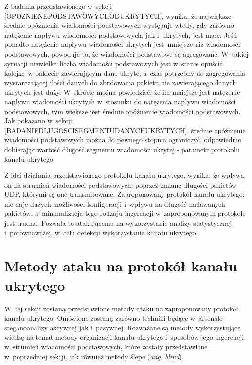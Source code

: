 \documentclass[a4paper, twoside, openright, 12pt]{report}
\begin{document}
        Z badania przedstawionego w~sekcji \ref{OPOZNIENEPODSTAWOWYCHODUKRYTYCH},
        wynika, że największe średnie opóźnienia wiadomości podstawowych
        występuje wtedy, gdy zarówno natężenie napływu wiadomości podstawowych, jak i~ukrytych, jest małe.
        Jeśli ponadto natężenie napływu wiadomości ukrytych jest mniejsze niż wiadomości podstawowych,
        powoduje to, że wiadomości podstawowe są agregowane.
        W~takiej sytuacji niewielka liczba wiadomości podstawowych jest w~stanie
        opuścić kolejkę w pakiecie zawierającym dane ukryte, a~czas potrzebny do
        zagregowania wystarczającej ilości danych do zbudowania pakietu nie
        zawierającego danych ukrytych jest duży. W~skrócie można powiedzieć, że
        im mniejsze jest natężenie napływu wiadomości ukrytych w~stosunku do natężenia
        napływu wiadomości podstawowych, tym większe jest średnie opóźnienie wiadomości podstawowych.
        Jak pokazano w~sekcji \ref{BADANIEDLUGOSCISEGMENTUDANYCHUKRYTYCH},
        średnie opóźnienie wiadomości podstawowych można do pewnego stopnia ograniczyć, odpowiednio
        dobierając wartość długość segmentu wiadomości ukrytej - parametr protokołu
        kanału ukrytego.

        Z idei działania przedstawionego protokołu kanału ukrytego, wynika, że wpływa on na strumień
        wiadomości podstawowych, poprzez zmianę długości pakietów UDP, którymi są one transmitowane.
        Zaproponowany protokół kanału ukrytego, nie daje dużych możliwości konfiguracji i~wpływu
        na długość nadawanych pakietów, a~minimalizacja tego rodzaju ingerencji
        w~zaproponowanym protokole jest trudna. Pozwala to atakującemu
        na wykorzystanie analizy statystycznej i~porównawczej, w~celu detekcji
        wykorzystania kanału ukrytego.

    \section{Metody ataku na protokół kanału ukrytego}
       W~tej sekcji zostaną przedstawione metody ataku na zaproponowany protokół kanału ukrytego. Omówione
       zostaną zarówno techniki będące w~arsenale steganoanalizy aktywnej jak
       i~pasywnej. Rozważane są metody wykorzystujące wiedzę na temat metody organizacji kanału ukrytego
       i~sposobów jego ingerencji w~strumień wiadomości podstawowych, które zostały
       przedstawione w~poprzedniej sekcji, jak również metody ślepe (\emph{ang. blind}).
\end{document}
